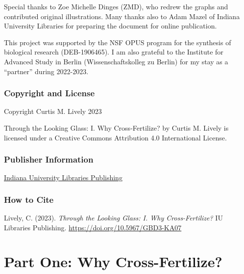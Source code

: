 \documentclass[
  letterpaper,
]{book}
\begin{document}
Special thanks to Zoe Michelle Dinges (ZMD), who redrew the graphs and
contributed original illustrations. Many thanks also to Adam Mazel of
Indiana University Libraries for preparing the document for online
publication.

This project was supported by the NSF OPUS program for the synthesis of
biological research (DEB-1906465). I am also grateful to the Institute
for Advanced Study in Berlin (Wissenschaftskolleg zu Berlin) for my stay
as a ``partner'' during 2022-2023.

\hypertarget{copyright-and-license}{%
\section*{Copyright and License}\label{copyright-and-license}}


Copyright Curtis M. Lively 2023

{Through the Looking Glass: I. Why Cross-Fertilize?} by Curtis M. Lively
is licensed under a Creative Commons Attribution 4.0 International
License.

\hypertarget{publisher-information}{%
\section*{Publisher Information}\label{publisher-information}}


\href{https://libraries.indiana.edu/scholarly-communication}{Indiana
University Libraries Publishing}

\hypertarget{how-to-cite}{%
\section*{How to Cite}\label{how-to-cite}}


Lively, C. (2023). \emph{Through the Looking Glass: I. Why
Cross-Fertilize?} IU Libraries Publishing.
\url{https://doi.org/10.5967/GBD3-KA07}

\part{Part One: Why Cross-Fertilize?}
\end{document}
